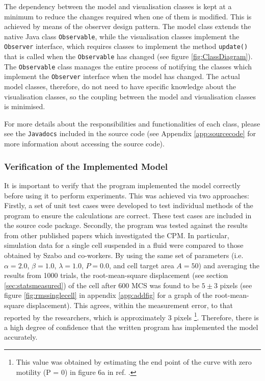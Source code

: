 \documentclass[a4paper,12pt]{article}
\begin{document}
The dependency between the model and visualisation classes is kept at a minimum to reduce the changes required when one of them is modified. This is achieved by means of the observer design pattern. The model class extends the native Java class \texttt{Observable}, while the visualisation classes implement the \texttt{Observer} interface, which requires classes to implement the method \texttt{update()} that is called when the \texttt{Observable} has changed (see figure \ref{fig:ClassDiagram}). The \texttt{Observable} class manages the entire process of notifying the classes which implement the \texttt{Observer} interface when the model has changed. The actual model classes, therefore, do not need to have specific knowledge about the visualisation classes, so the coupling between the model and visualisation classes is minimised.

For more details about the responsibilities and functionalities of each class, please see the \texttt{Javadocs} included in the source code (see Appendix \ref{app:sourcecode} for more information about accessing the source code). 


\subsubsection{Verification of the Implemented Model}
It is important to verify that the program implemented the model correctly before using it to perform experiments. This was achieved via two approaches: Firstly, a set of unit test cases were developed to test individual methods of the program to ensure the calculations are correct. These test cases are included in the source code package. Secondly, the program was tested against the results from other published papers which investigated the CPM. In particular, simulation data for a single cell suspended in a fluid were compared to those obtained by Szabo and co-workers\cite{szabo2010}. By using the same set of parameters (i.e. $\alpha = 2.0$, $\beta = 1.0$, $\lambda = 1.0$, $P = 0.0$, and cell target area $A = 50$) and averaging the results from 1000 trials, the root-mean-square displacement (see section \ref{sec:statsmeasured}) of the cell after 600 MCS was found to be $5 \pm 3$ pixels (see figure \ref{fig:rmssinglecell} in appendix \ref{app:addfig} for a graph of the root-mean-square displacement). This agrees, within the measurement error, to that reported by the researchers, which is approximately 3 pixels \footnote{This value was obtained by estimating the end point of the curve with zero motility (P = 0) in figure 6a in ref. \cite{szabo2010}.}. Therefore, there is a high degree of confidence that the written program has implemented the model accurately.
\end{document}
